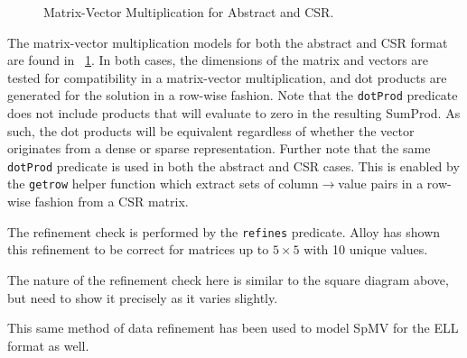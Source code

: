 \begin{figure}

\caption{Matrix-Vector Multiplication for Abstract and CSR.}
\label{model:mvm}
\end{figure}

The matrix-vector multiplication models for both the abstract and CSR format are found in \figurename~\ref{model:mvm}.  In both cases, the dimensions of the matrix and vectors are tested for compatibility in a matrix-vector multiplication, and dot products are generated for the solution in a row-wise fashion.  Note that the \texttt{dotProd} predicate does not include products that will evaluate to zero in the resulting SumProd.  As such, the dot products will be equivalent regardless of whether the vector originates from a dense or sparse representation.  Further note that the same \texttt{dotProd} predicate is used in both the abstract and CSR cases.  This is enabled by the \texttt{getrow} helper function which extract sets of column$\rightarrow$value pairs in a row-wise fashion from a CSR matrix.

The refinement check is performed by the \texttt{refines} predicate.  Alloy has shown this refinement to be correct for matrices up to $5\times5$ with 10 unique values.

The nature of the refinement check here is similar to the square diagram above, but need to show it precisely as it varies slightly.

This same method of data refinement has been used to model SpMV for the ELL format as well.